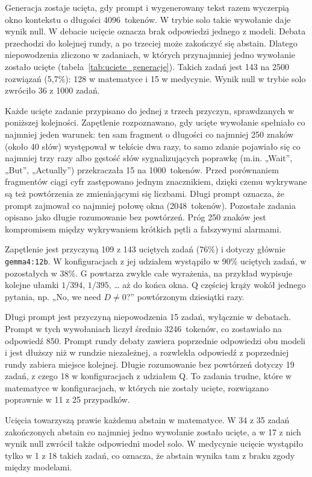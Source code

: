 Generacja zostaje ucięta, gdy prompt i wygenerowany tekst razem wyczerpią okno kontekstu o długości 4096~tokenów. W trybie solo takie wywołanie daje wynik null. W debacie ucięcie oznacza brak odpowiedzi jednego z modeli. Debata przechodzi do kolejnej rundy, a po trzeciej może zakończyć się abstain. Dlatego niepowodzenia zliczono w zadaniach, w których przynajmniej jedno wywołanie zostało ucięte (tabela~\ref{tab:uciete_generacje}). Takich zadań jest 143 na 2500 rozwiązań (5,7\%): 128 w matematyce i 15 w medycynie. Wynik null w trybie solo zwróciło 36 z 1000 zadań.



Każde ucięte zadanie przypisano do jednej z trzech przyczyn, sprawdzanych w poniższej kolejności. Zapętlenie rozpoznawano, gdy ucięte wywołanie spełniało co najmniej jeden warunek: ten sam fragment o długości co najmniej 250 znaków (około 40 słów) występował w tekście dwa razy, to samo zdanie pojawiało się co najmniej trzy razy albo gęstość słów sygnalizujących poprawkę (m.in. „Wait”, „But”, „Actually”) przekraczała 15 na 1000~tokenów. Przed porównaniem fragmentów ciągi cyfr zastępowano jednym znacznikiem, dzięki czemu wykrywane są też powtórzenia ze zmieniającymi się liczbami. Długi prompt oznacza, że prompt zajmował co najmniej połowę okna (2048~tokenów). Pozostałe zadania opisano jako długie rozumowanie bez powtórzeń. Próg 250 znaków jest kompromisem między wykrywaniem krótkich pętli a fałszywymi alarmami.

Zapętlenie jest przyczyną 109 z 143 uciętych zadań (76\%) i dotyczy głównie \texttt{gemma4:12b}. W konfiguracjach z jej udziałem wystąpiło w 90\% uciętych zadań, w pozostałych w 38\%. G powtarza zwykle całe wyrażenia, na przykład wypisuje kolejne ułamki $1/394$, $1/395$, \ldots{} aż do końca okna. Q częściej krąży wokół jednego pytania, np. „No, we need $D \neq 0$?” powtórzonym dziesiątki razy.

Długi prompt jest przyczyną niepowodzenia 15 zadań, wyłącznie w debatach. Prompt w tych wywołaniach liczył średnio 3246~tokenów, co zostawiało na odpowiedź 850. Prompt rundy debaty zawiera poprzednie odpowiedzi obu modeli i jest dłuższy niż w rundzie niezależnej, a rozwlekła odpowiedź z poprzedniej rundy zabiera miejsce kolejnej. Długie rozumowanie bez powtórzeń dotyczy 19 zadań, z czego 18 w konfiguracjach z udziałem Q. To zadania trudne, które w matematyce w konfiguracjach, w których nie zostały ucięte, rozwiązano poprawnie w 11 z 25 przypadków.

Ucięcia towarzyszą prawie każdemu abstain w matematyce. W 34 z 35 zadań zakończonych abstain co najmniej jedno wywołanie zostało ucięte, a w 17 z nich wynik null zwrócił także odpowiedni model solo. W medycynie ucięcie wystąpiło tylko w 1 z 18 takich zadań, co oznacza, że abstain wynika tam z braku zgody między modelami.


